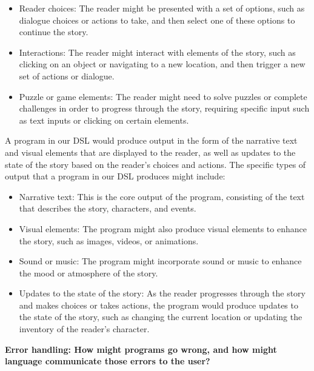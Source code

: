 \begin{itemize}
                \item Reader choices: The reader might be presented with a set of options, such as dialogue choices or actions to take, and then select one of these options to continue the story.
                \item Interactions: The reader might interact with elements of the story, such as clicking on an object or navigating to a new location, and then trigger a new set of actions or dialogue.
                \item Puzzle or game elements: The reader might need to solve puzzles or complete challenges in order to progress through the story, requiring specific input such as text inputs or clicking on certain elements.
 \end{itemize}
A program in our DSL would produce output in the form of the narrative text and visual elements that are displayed to the reader, as well as updates to the state of the story based on the reader's choices and actions. The specific types of output that a program in our DSL produces might include:

\begin{itemize}
                \item Narrative text: This is the core output of the program, consisting of the text that describes the story, characters, and events.
                \item Visual elements: The program might also produce visual elements to enhance the story, such as images, videos, or animations.
                \item Sound or music: The program might incorporate sound or music to enhance the mood or atmosphere of the story.
                \item Updates to the state of the story: As the reader progresses through the story and makes choices or takes actions, the program would produce updates to the state of the story, such as changing the current location or updating the inventory of the reader's character.
 \end{itemize}

\textbf {Error handling: How might programs go wrong, and how might  language communicate those errors to the user?}

